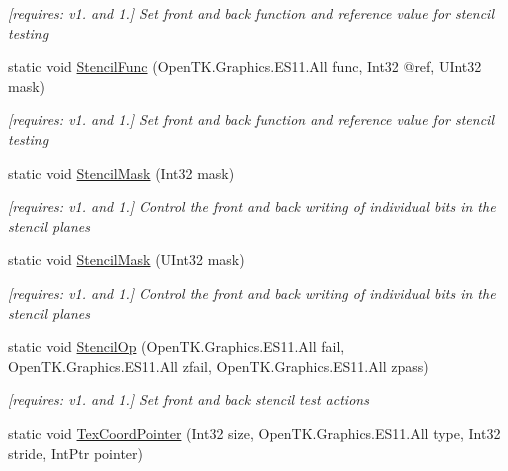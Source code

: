 \begin{DoxyCompactItemize}
\begin{DoxyCompactList}\small\item\em \mbox{[}requires\-: v1. and 1.\mbox{]} Set front and back function and reference value for stencil testing \end{DoxyCompactList}\item 
static void \hyperlink{class_open_t_k_1_1_graphics_1_1_e_s11_1_1_g_l_a041ca01b3d8cc7a121136675353d16d9}{Stencil\-Func} (Open\-T\-K.\-Graphics.\-E\-S11.\-All func, Int32 @ref, U\-Int32 mask)
\begin{DoxyCompactList}\small\item\em \mbox{[}requires\-: v1. and 1.\mbox{]} Set front and back function and reference value for stencil testing \end{DoxyCompactList}\item 
static void \hyperlink{class_open_t_k_1_1_graphics_1_1_e_s11_1_1_g_l_a745344198c666d55cf40c6e2037f8eb0}{Stencil\-Mask} (Int32 mask)
\begin{DoxyCompactList}\small\item\em \mbox{[}requires\-: v1. and 1.\mbox{]} Control the front and back writing of individual bits in the stencil planes \end{DoxyCompactList}\item 
static void \hyperlink{class_open_t_k_1_1_graphics_1_1_e_s11_1_1_g_l_a754ce50f4c5cb244a74bfd0a9c947c83}{Stencil\-Mask} (U\-Int32 mask)
\begin{DoxyCompactList}\small\item\em \mbox{[}requires\-: v1. and 1.\mbox{]} Control the front and back writing of individual bits in the stencil planes \end{DoxyCompactList}\item 
static void \hyperlink{class_open_t_k_1_1_graphics_1_1_e_s11_1_1_g_l_af8a0ed8194c6ce039f0be225c7973c32}{Stencil\-Op} (Open\-T\-K.\-Graphics.\-E\-S11.\-All fail, Open\-T\-K.\-Graphics.\-E\-S11.\-All zfail, Open\-T\-K.\-Graphics.\-E\-S11.\-All zpass)
\begin{DoxyCompactList}\small\item\em \mbox{[}requires\-: v1. and 1.\mbox{]} Set front and back stencil test actions \end{DoxyCompactList}\item 
static void \hyperlink{class_open_t_k_1_1_graphics_1_1_e_s11_1_1_g_l_acbf9b737f474cb9e2a702208d71f91d7}{Tex\-Coord\-Pointer} (Int32 size, Open\-T\-K.\-Graphics.\-E\-S11.\-All type, Int32 stride, Int\-Ptr pointer)

\end{DoxyCompactItemize}
